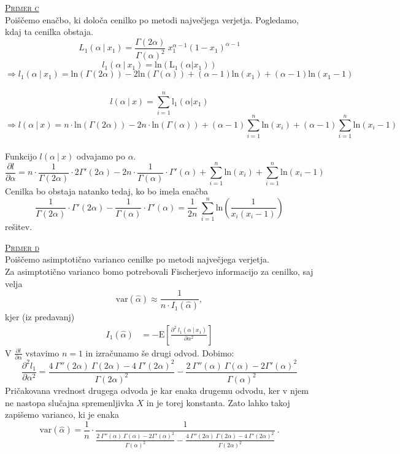 \documentclass[a4paper,12pt]{article}
\begin{document}
\noindent
\textsc{\underline{Primer c}}
\\
Poiščemo enačbo, ki določa cenilko po metodi največjega verjetja. Pogledamo, kdaj ta cenilka obstaja.
$$ L_1 (\alpha \ | \ x_1) = \frac{\Gamma (2 \alpha)}{\Gamma (\alpha)^2} \ x_1^{\alpha - 1} (1 - x_1)^{\alpha - 1} $$
$$ l_1 (\alpha \ | \ x_1) = \text{ln}(\text{L}_1 (\alpha | x_1)) $$
$$ \Rightarrow l_1 (\alpha \ | \ x_1) = \text{ln}(\Gamma (2 \alpha)) - 2 \text{ln} (\Gamma (\alpha)) + (\alpha - 1) \text{ln}(x_1) + (\alpha - 1) \text{ln}(x_1 - 1) $$
\\
$$ l (\alpha \ | \ x) = \sum_{i = 1}^{n} \text{l}_1 (\alpha | x_1) $$
$$ \Rightarrow l (\alpha \ | \ x) = n \cdot \text{ln}(\Gamma (2 \alpha)) - 2 n \cdot \text{ln}(\Gamma (\alpha)) + (\alpha - 1) \sum_{i = 1}^{n} \text{ln}(x_i) + (\alpha - 1) \sum_{i = 1}^{n} \text{ln} (x_i - 1)$$
\\
Funkcijo $ l (\alpha \ | \ x) $ odvajamo po $\alpha$.
$$ \frac{\partial l}{\partial \alpha} = n \cdot \frac{1}{\Gamma (2 \alpha)} \cdot 2 \Gamma' (2 \alpha) - 2n \cdot \frac{1}{\Gamma (\alpha)} \cdot \Gamma' (\alpha) + \sum_{i = 1}^{n} \text{ln}(x_i) + \sum_{i = 1}^{n} \text{ln}(x_i - 1)$$
Cenilka bo obstaja natanko tedaj, ko bo imela enačba
 $$ \frac{1}{\Gamma (2 \alpha)} \cdot \Gamma' (2 \alpha) - \frac{1}{\Gamma (\alpha)} \cdot \Gamma' (\alpha) = \frac{1}{2n} \ \sum_{i = 1}^{n} \text{ln} \left( \frac{1}{x_i(x_i - 1)} \right) $$
rešitev.

\noindent
\textsc{\underline{Primer d}}
\\
Poiščemo asimptotično varianco cenilke po metodi največjega verjetja.
\\
Za asimptotično varianco bomo potrebovali Fischerjevo informacijo za cenilko, saj velja 
$$\text{var}(\hat{\alpha}) \approx \frac{1}{n \cdot I_1(\hat{\alpha})}, $$
kjer (iz predavanj) 
\begin{align}\label{en:fish}
    I_1(\hat{\alpha}) &= - \text{E} \left[ \frac{ \partial^2 \ l_1(\alpha \ | \ x_1)}{\partial \alpha^2} \right]
\end{align}
V $\frac{\partial l}{\partial \alpha}$ vstavimo $n = 1$ in izračunamo še drugi odvod. Dobimo:
$$ \frac{\partial^2 l_1}{\partial \alpha^2} = \frac{4 \ \Gamma '' (2 \alpha) \ \Gamma(2 \alpha) - 4 \ \Gamma' (2 \alpha)^2}{\Gamma (2 \alpha) ^2} - \frac{2 \ \Gamma '' (\alpha) \ \Gamma (\alpha) - 2 \Gamma ' (\alpha) ^ 2}{\Gamma (\alpha)^2}$$
Pričakovana vrednost drugega odvoda je kar enaka drugemu odvodu, ker v njem ne nastopa slučajna spremenljivka $X$ in je torej konstanta. Zato lahko takoj zapišemo varianco, ki je enaka
$$\text{var}(\hat{\alpha}) = \frac{1}{n} \cdot \frac{1}{ \frac{2 \ \Gamma '' (\alpha) \ \Gamma (\alpha) - 2 \Gamma ' (\alpha) ^ 2}{\Gamma (\alpha)^2} - \frac{4 \ \Gamma '' (2 \alpha) \ \Gamma(2 \alpha) - 4 \ \Gamma' (2 \alpha)^2}{\Gamma (2 \alpha) ^2} } \ .$$
\end{document}
